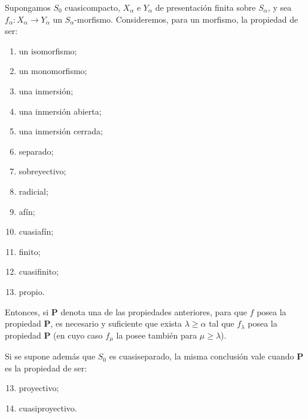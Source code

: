 \begin{theorem}[8.10.5]
Supongamos $S_0$ cuasicompacto, $X_\alpha$ e $Y_\alpha$ de presentación finita sobre $S_\alpha$, y sea $f_\alpha:X_\alpha\to Y_\alpha$ un $S_\alpha$-morfismo.
Consideremos, para un morfismo, la propiedad de ser:
\begin{enumerate}[label=\textup{(\roman*)}]
\item un isomorfismo;
\item[\rm(i\,\emph{bis})] un monomorfismo;
\item una inmersión;
\item una inmersión abierta;
\item una inmersión cerrada;
\item separado;
\item sobreyectivo;
\item radicial;
\item afín;
\item cuasiafín;
\item finito;
\item cuasifinito;
\item propio.
\end{enumerate}
Entonces, si $\boldsymbol{P}$ denota una de las propiedades anteriores, para que $f$ posea la propiedad $\boldsymbol{P}$, es necesario y suficiente que exista $\lambda\geq\alpha$ tal que $f_\lambda$ posea la propiedad $\boldsymbol{P}$ (en cuyo caso $f_\mu$ la posee también para $\mu\geq\lambda$).

Si se supone además que $S_0$ es cuasiseparado, la misma conclusión vale cuando $\boldsymbol{P}$ es la propiedad de ser:
\begin{enumerate}[label=\textup{(\roman*)}]
\setcounter{enumi}{12}
\item proyectivo;
\item cuasiproyectivo.
\end{enumerate}
\end{theorem}

